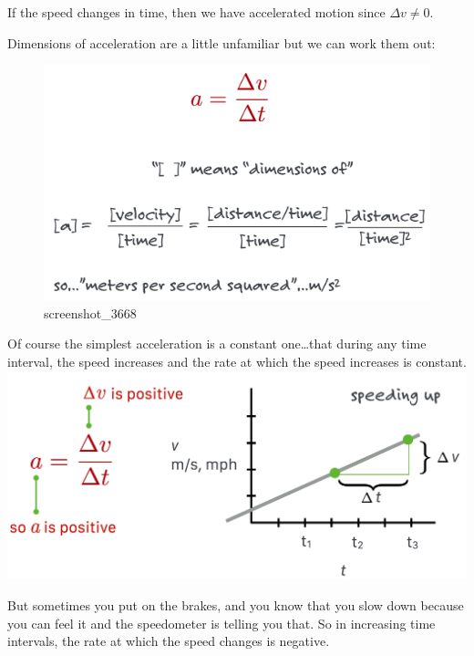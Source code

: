 \documentclass[
  letterpaper,
  DIV=11,
  numbers=noendperiod,
  oneside]{scrreprt}
\begin{document}
If the speed changes in time, then we have accelerated motion since
\(\Delta v \ne 0\).

Dimensions of acceleration are a little unfamiliar but we can work them
out:

\begin{figure}[H]

{\centering \includegraphics[width=0.8\linewidth,height=\textheight,keepaspectratio]{mechanics/motion/screenshot_3668.png}

}

\caption{screenshot\_3668}

\end{figure}%

Of course the simplest acceleration is a constant one\ldots that during
any time interval, the speed increases and the rate at which the speed
increases is constant.
\includegraphics[width=0.8\linewidth,height=\textheight,keepaspectratio]{mechanics/motion/screenshot_3669.png}

But sometimes you put on the brakes, and you know that you slow down
because you can feel it and the speedometer is telling you that. So in
increasing time intervals, the rate at which the speed changes is
negative.
\end{document}
